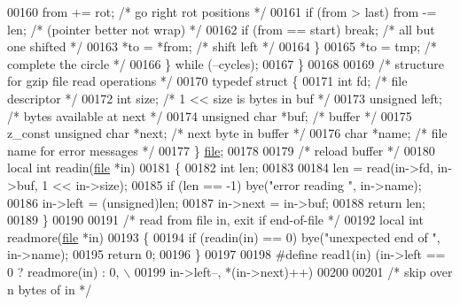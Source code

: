\begin{DoxyCode}
{00160             from += rot;                \textcolor{comment}{/* go right rot positions */}
00161             \textcolor{keywordflow}{if} (from > last) from -= len;   \textcolor{comment}{/* (pointer better not wrap) */}
00162             \textcolor{keywordflow}{if} (from == start) \textcolor{keywordflow}{break};   \textcolor{comment}{/* all but one shifted */}
00163             *to = *from;                \textcolor{comment}{/* shift left */}
00164         \}
00165         *to = tmp;                      \textcolor{comment}{/* complete the circle */}
00166     \} \textcolor{keywordflow}{while} (--cycles);
00167 \}
00168 
00169 \textcolor{comment}{/* structure for gzip file read operations */}
00170 \textcolor{keyword}{typedef} \textcolor{keyword}{struct }\{
00171     \textcolor{keywordtype}{int} fd;                     \textcolor{comment}{/* file descriptor */}
00172     \textcolor{keywordtype}{int} size;                   \textcolor{comment}{/* 1 << size is bytes in buf */}
00173     \textcolor{keywordtype}{unsigned} left;              \textcolor{comment}{/* bytes available at next */}
00174     \textcolor{keywordtype}{unsigned} \textcolor{keywordtype}{char} *buf;         \textcolor{comment}{/* buffer */}
00175     z\_const \textcolor{keywordtype}{unsigned} \textcolor{keywordtype}{char} *next;    \textcolor{comment}{/* next byte in buffer */}
00176     \textcolor{keywordtype}{char} *name;                 \textcolor{comment}{/* file name for error messages */}
00177 \} \hyperlink{structfile}{file};
00178 
00179 \textcolor{comment}{/* reload buffer */}
00180 local \textcolor{keywordtype}{int} readin(\hyperlink{structfile}{file} *in)
00181 \{
00182     \textcolor{keywordtype}{int} len;
00183 
00184     len = read(in->fd, in->buf, 1 << in->size);
00185     \textcolor{keywordflow}{if} (len == -1) bye(\textcolor{stringliteral}{"error reading "}, in->name);
00186     in->left = (unsigned)len;
00187     in->next = in->buf;
00188     \textcolor{keywordflow}{return} len;
00189 \}
00190 
00191 \textcolor{comment}{/* read from file in, exit if end-of-file */}
00192 local \textcolor{keywordtype}{int} readmore(\hyperlink{structfile}{file} *in)
00193 \{
00194     \textcolor{keywordflow}{if} (readin(in) == 0) bye(\textcolor{stringliteral}{"unexpected end of "}, in->name);
00195     \textcolor{keywordflow}{return} 0;
00196 \}
00197 
00198 \textcolor{preprocessor}{#define read1(in) (in->left == 0 ? readmore(in) : 0, \(\backslash\)}
00199 \textcolor{preprocessor}{                   in->left--, *(in->next)++)}
00200 
00201 \textcolor{comment}{/* skip over n bytes of in */}
}
\end{DoxyCode}
